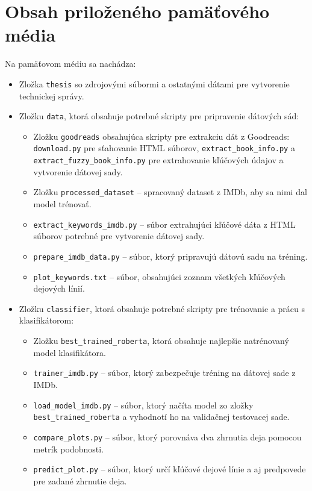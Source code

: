 \chapter{Obsah priloženého pamäťového média}

Na pamäťovom médiu sa nachádza:
\begin{itemize}
    \item Zložka {\tt thesis} so zdrojovými súbormi a ostatnými dátami pre vytvorenie technickej správy.
    \item Zložku {\tt data}, ktorá obsahuje potrebné skripty pre pripravenie dátových sád:
    \begin{itemize}
        \item Zložku {\tt goodreads} obsahujúca skripty pre extrakciu dát z Goodreads: {\tt download.py} pre sťahovanie HTML súborov,  {\tt extract\_book\_info.py} a {\tt extract\_fuzzy\_book\_info.py} pre extrahovanie kľúčových údajov a vytvorenie dátovej sady.
        \item Zložku {\tt processed\_dataset} -- spracovaný dataset z IMDb, aby sa nimi dal model trénovať.
        \item {\tt extract\_keywords\_imdb.py} -- súbor extrahujúci kľúčové dáta z HTML súborov potrebné pre vytvorenie dátovej sady.
         \item {\tt prepare\_imdb\_data.py} -- súbor, ktorý pripravujú dátovú sadu na tréning.
         \item {\tt plot\_keywords.txt} -- súbor, obsahujúci zoznam všetkých kľúčových dejových línií.
    \end{itemize}
    \item Zložku {\tt classifier}, ktorá obsahuje potrebné skripty pre trénovanie a prácu s klasifikátorom:
    \begin{itemize}
        \item Zložku {\tt best\_trained\_roberta}, ktorá obsahuje najlepšie natrénovaný model klasifikátora.
        \item {\tt trainer\_imdb.py} -- súbor, ktorý zabezpečuje tréning na dátovej sade z IMDb.
        \item {\tt load\_model\_imdb.py} -- súbor, ktorý načíta model zo zložky {\tt best\_trained\_roberta} a vyhodnotí ho na validačnej testovacej sade.
        \item {\tt compare\_plots.py} -- súbor, ktorý porovnáva dva zhrnutia deja pomocou metrík podobnosti.
        \item {\tt predict\_plot.py} -- súbor, ktorý určí kľúčové dejové línie a aj predpovede pre zadané zhrnutie deja.

\end{itemize}
\end{itemize}
